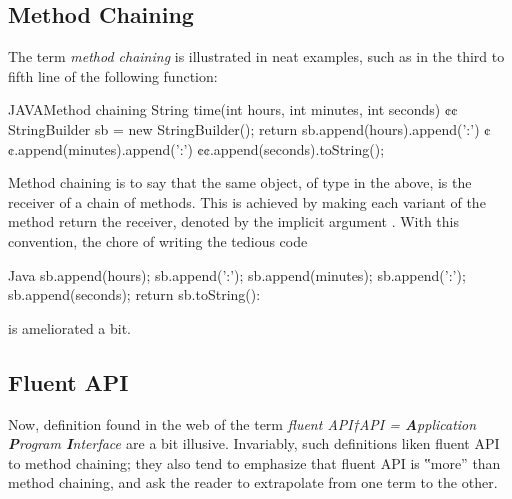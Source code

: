 \subsection{Method Chaining}
The term \emph{method chaining} is illustrated in neat examples, such
    as in the third to fifth line of the following \Java function:
\begin{lCode}{JAVA}{Method chaining}
String time(int hours, int minutes, int seconds) {¢¢
  StringBuilder sb = new StringBuilder();
  return sb.append(hours).append(':')
          ¢¢.append(minutes).append(':')
          ¢¢.append(seconds).toString();
}
\end{lCode}
Method chaining is to say that the same object,  of type  in the above,
   is the receiver of a chain of methods.
This is achieved by making each variant of the method  return the receiver, denoted by the
  implicit argument .
With this convention, the chore of writing the tedious code
\begin{lcode}{Java}
sb.append(hours);
sb.append(':');
sb.append(minutes);
sb.append(':');
sb.append(seconds);
return sb.toString():
\end{lcode}
is ameliorated a bit.

\subsection{Fluent API}
Now, definition found in the web of the term \emph{fluent API†{API =
    \textbf Application \textbf Program \textbf Interface
}} are a bit illusive.
Invariably, such definitions liken fluent API to method chaining;
  they also tend to emphasize that fluent API is ‟more” than method
  chaining, and ask the reader to extrapolate from one term to the other.

